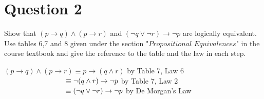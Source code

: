 \documentclass[a4paper,12pt]{article}
\newcommand\tab[1][1cm]{\hspace*{#1}}
\begin{document}
\section*{Question 2 \hfill {}}
\tab Show that $(p \rightarrow q) \wedge (p \rightarrow r)$ and $(\neg q \vee \neg r)\rightarrow \neg p$ are logically equivalent. Use tables 6,7 and 8 given under the section "$\textit{Propositional Equivalences}$" in the course textbook and give the reference to the table and the law in each step.

\begin{tcolorbox}
$ (p \rightarrow q) \wedge(p \rightarrow r) \equiv p \rightarrow (q \wedge r) $ by Table 7, Law 6\newline
$ \tab \tab \tab \equiv \neg (q \wedge r) \rightarrow \neg p$ by Table 7, Law 2 \newline
$ \tab \tab \tab \equiv (\neg q \vee \neg r) \rightarrow \neg p$ by De Morgan's Law
\end{tcolorbox}
\newpage
\end{document}
